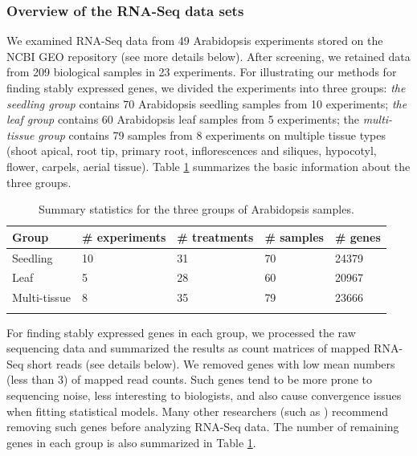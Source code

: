 \documentclass[letterpaper,12pt]{article}
\begin{document}
\subsubsection*{Overview of the RNA-Seq data sets}
We examined RNA-Seq data from 49 Arabidopsis experiments stored on the NCBI
GEO repository (see more details below). After screening, we retained data
from 209 biological samples in 23 experiments.  For illustrating our methods
for finding stably expressed genes, we divided the experiments into three
groups: \textit{the seedling group} contains  70 Arabidopsis seedling samples
from 10 experiments; \textit{ the leaf group} contains 60 Arabidopsis leaf
samples from 5 experiments;  the \textit{multi-tissue group} contains 79
samples from 8 experiments on multiple tissue types (shoot apical, root tip,
primary root, inflorescences and siliques, hypocotyl, flower, carpels, aerial
tissue).  Table \ref{table:TableSet3} summarizes the basic information about
the three groups.
\begin{table}[!ht]
    \centering
    \caption{Summary statistics for the three groups of Arabidopsis samples.}
    \begin{tabular}{lp{2.4cm}p{2.3cm}p{2cm}p{1.5cm}} \hline
	Group & \#  experiments & \# treatments  & \# samples & \# genes \\ \hline
	Seedling &10 & 31 &70  &24379  \\
	Leaf &5 & 28 & 60 &20967  \\
	Multi-tissue &8 &35  &79  & 23666\\ \hline
	\label{table:TableSet3}
    \end{tabular}
\end{table}

For finding stably expressed genes in each group, we processed the raw
sequencing data and summarized the results as count matrices of mapped RNA-Seq
short reads (see details below).  We removed genes with low mean numbers (less
than 3) of mapped read counts.  Such genes tend to be more prone to sequencing
noise, less interesting to biologists, and also cause convergence issues when
fitting statistical models. Many other researchers (such as \citealt{anders2013count})
recommend removing such genes before analyzing RNA-Seq data.  The number of
remaining genes in each group is also summarized in Table
\ref{table:TableSet3}.
\end{document}

